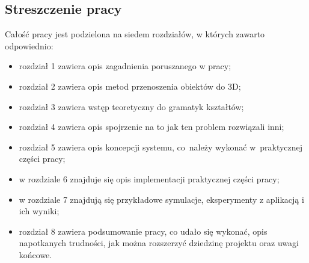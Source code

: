 \subsection{Streszczenie pracy}
Całość pracy jest podzielona na siedem rozdziałów, w których zawarto
odpowiednio:
\begin{itemize}
  \item rozdział 1 zawiera opis zagadnienia poruszanego w pracy;
  \item rozdział 2 zawiera opis metod przenoszenia obiektów do 3D;
  \item rozdział 3 zawiera wstęp teoretyczny do gramatyk kształtów;
  \item rozdział 4 zawiera opis spojrzenie na to jak ten problem rozwiązali
  inni;
  \item rozdział 5 zawiera opis koncepcji systemu, co~należy wykonać
  w~praktycznej części pracy;
  \item w rozdziale 6 znajduje się opis implementacji praktycznej części pracy;
  \item w rozdziale 7 znajdują się przykładowe symulacje, eksperymenty z
  aplikacją i ich wyniki;
  \item rozdział 8 zawiera podsumowanie pracy, co udało się wykonać, opis
  napotkanych trudności, jak można rozszerzyć dziedzinę projektu oraz uwagi
  końcowe.
\end{itemize}
